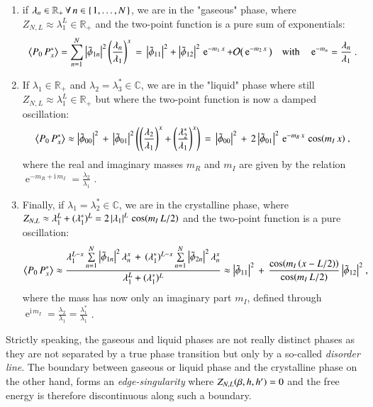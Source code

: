\documentclass[epj]{webofc}
\let\originalleft\left
\let\originalright\right
\renewcommand{\left}{\mathopen{}\mathclose\bgroup\originalleft}
\renewcommand{\right}{\aftergroup\egroup\originalright}
\newcommand{\e}{\operatorname{e}}
\newcommand{\of}[1]{\left(#1\right)}
\newcommand{\ssof}[1]{(#1)}
\newcommand{\cof}[1]{\left\{\right.#1\left.\right\}}
\newcommand{\savof}[1]{\big\langle #1\big\rangle}
\newcommand{\ii}{\mathrm{i}}
\newcommand{\order}[1]{\mathcal{O}\big(#1\big)}
\newcommand{\abs}[1]{\left| #1\right|}
\renewcommand*\[{\begin{equation}}
\renewcommand*\]{\end{equation}}
\let\oldemph\emph
\renewcommand*\emph[1]{\oldemph{\textcolor{emphcol}{#1}}}
\begin{document}
\begin{enumerate}
\item if $\lambda_{n}\in\mathbb{R}_{+}\,\forall\,n\in\cof{1,\ldots,N}$, we are in the "gaseous" phase, where $Z_{N,L}\approx\lambda_{1}^{L}\in\mathbb{R}_{+}$ and the two-point function is a pure sum of exponentials:
\[
\savof{P_{0}\,P^{*}_{x}}=\sum\limits_{n=1}^{N}\,\abs{\tilde{\phi}_{1 n}}^{2}\,\of{\frac{\lambda_{n}}{\lambda_{1}}}^{x}\,=\,\abs{\tilde{\phi}_{1 1}}^{2}+\abs{\tilde{\phi}_{1 2}}^{2}\,\e^{-m_{1}\,x}+\order{\e^{-m_{2}\,x}}\quad\text{with}\quad \e^{-m_{n}}=\frac{\lambda_{n}}{\lambda_{1}}\ .
\]
\item If $\lambda_{1}\in\mathbb{R}_{+}$ and $\lambda_{2}=\lambda_{3}^{*}\in\mathbb{C}$, we are in the "liquid" phase where still $Z_{N,L}\approx\lambda_{1}^{L}\in\mathbb{R}_{+}$ but where the two-point function is now a damped oscillation:
\[
\savof{P_{0}\,P^{*}_{x}}\approx \abs{\tilde{\phi}_{0 0}}^{2}\,+\,\abs{\tilde{\phi}_{0 1}}^{2}\,\of{\of{\frac{\lambda_{2}}{\lambda_{1}}}^{x}+\of{\frac{\vphantom{\lambda_{2}}\smash{\lambda_{2}^{*}}}{\lambda_{1}}}^{x}}\,=\,\abs{\tilde{\phi}_{0 0}}^{2}\,+\,2\,\abs{\tilde{\phi}_{0 1}}^{2}\,\e^{-m_{R}\,x}\,\cos\of{m_{I}\,x}\ ,
\]
where the real and imaginary masses $m_{R}$ and $m_{I}$ are given by the relation $\e^{-m_{R}+\ii\,m_{I}}=\frac{\lambda_{2}}{\lambda_{1}}$ .
\item Finally, if $\lambda_{1}=\lambda_{2}^{*} \in \mathbb{C}$, we are in the crystalline phase, where $Z_{N,L}\approx\lambda_{1}^{L}+\ssof{\lambda_{1}^{*}}^{L}=2\,\abs{\lambda_{1}}^{L}\,\cos\of{m_{I}\,L/2}$ and the two-point function is a pure oscillation:
\[
\savof{P_{0}\,P^{*}_{x}}\approx \frac{\lambda_{1}^{L-x}\sum\limits_{n=1}^{N}\,\abs{\tilde{\phi}_{1 n}}^{2}\,\lambda_{n}^{x}\,+\,\ssof{\lambda_{1}^{*}}^{L-x}\sum\limits_{n=1}^{N}\,\abs{\tilde{\phi}_{2 n}}^{2}\,\lambda_{n}^{x}}{\lambda_{1}^{L}+\ssof{\lambda_{1}^{*}}^{L}}\approx \abs{\tilde{\phi}_{1 1}}^{2}\,+\,\frac{\cos\of{m_{I}\,\of{x-L/2}}}{\cos\of{m_{I}\,L/2}}\,\abs{\tilde{\phi}_{1 2}}^{2}\ ,
\]
where the mass has now only an imaginary part $m_{I}$, defined through $\e^{\ii\,m_{I}}=\frac{\lambda_{2}}{\lambda_{1}}=\frac{\lambda^{*}_{1}}{\lambda_{1}}$ .
\end{enumerate}
Strictly speaking, the gaseous and liquid phases are not really distinct phases as they are not separated by a true phase transition but only by a so-called \emph{disorder line}. The boundary between gaseous or liquid phase and the crystalline phase on the other hand, forms an \emph{edge-singularity} where $Z_{N,L}\of{\beta,h,h'}=0$ and the free energy is therefore discontinuous along such a boundary.\\
\end{document}
